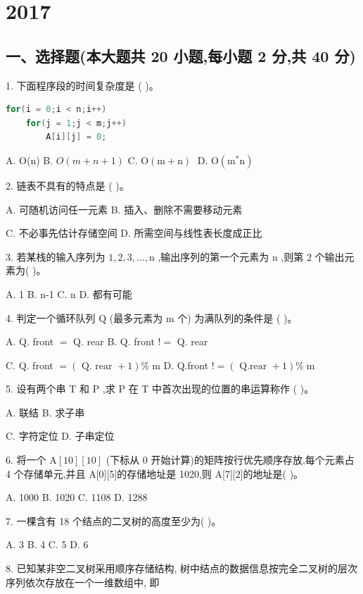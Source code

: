 \chapter{2017}
\section*{一、选择题(本大题共 20 小题,每小题 2 分,共 40 分)}

1. 下面程序段的时间复杂度是 (   )。
\begin{lstlisting}[language=C, basicstyle=\ttfamily]
for(i = 0;i < n;i++)
    for(j = 1;j < m;j++)
        A[i][j] = 0;
\end{lstlisting}

A. O(n) B. \(O\left( {m + n + 1}\right)\) C. \(\mathrm{O}\left( {\mathrm{m} + \mathrm{n}}\right) \;\) D. \(\mathrm{O}\left( {{\mathrm{m}}^{ * }\mathrm{n}}\right)\)

2. 链表不具有的特点是 (   )。

A. 可随机访问任一元素 B. 插入、删除不需要移动元素

C. 不必事先估计存储空间 D. 所需空间与线性表长度成正比

3. 若某栈的输入序列为 \(1,2,3,\ldots ,\mathrm{n}\) ,输出序列的第一个元素为 \(\mathrm{n}\) ,则第 2 个输出元素为(   )。

A. 1 B. n-1 C. n D. 都有可能

4. 判定一个循环队列 \(\mathrm{Q}\) (最多元素为 \(\mathrm{m}\) 个) 为满队列的条件是 (   )。

A. Q. front \(=\) Q. rear B. Q. front \(! =\) Q. rear

C. Q. front \(= \left( {\text{ Q. rear } + 1}\right) \% \mathrm{\;m}\) D. Q.front \(! = \left( {\text{ Q.rear } + 1}\right) \% \mathrm{\;m}\)

5. 设有两个串 \(\mathrm{T}\) 和 \(\mathrm{P}\) ,求 \(\mathrm{P}\) 在 \(\mathrm{T}\) 中首次出现的位置的串运算称作 (   )。

A. 联结 B. 求子串

C. 字符定位 D. 子串定位

6. 将一个 \(\mathrm{A}\left\lbrack  {10}\right\rbrack  \left\lbrack  {10}\right\rbrack\) (下标从 0 开始计算)的矩阵按行优先顺序存放,每个元素占 4 个存储单元,并且 A[0][5]的存储地址是 1020,则 A[7][2]的地址是(   )。

A. 1000 B. 1020 C. 1108 D. 1288

7. 一棵含有 18 个结点的二叉树的高度至少为(   )。

A. 3 B. 4 C. 5 D. 6

8. 已知某非空二叉树采用顺序存储结构, 树中结点的数据信息按完全二叉树的层次序列依次存放在一个一维数组中, 即

